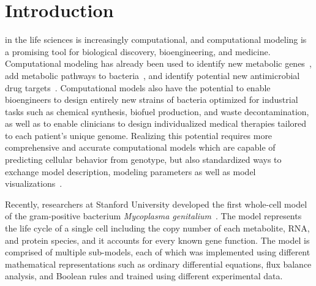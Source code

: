 \documentclass[journal,transmag]{IEEEtran}
\begin{document}
\maketitle
\IEEEdisplaynontitleabstractindextext
\IEEEpeerreviewmaketitle

\section{Introduction}
% 
% 
% 
% 

 in the life sciences is increasingly computational, and computational modeling is a promising tool for biological discovery, bioengineering, and medicine. Computational modeling has already been used to identify new metabolic genes~\cite{Reed2006}, add metabolic pathways to bacteria~\cite{Lee2009}, and identify potential new antimicrobial drug targets~\cite{Lee2012}. 
Computational models also have the potential to enable bioengineers to design entirely new strains of bacteria optimized for industrial tasks such as chemical synthesis, biofuel production, and waste decontamination, as well as to enable clinicians to design individualized medical therapies tailored to each patient's unique genome. 
Realizing this potential requires more comprehensive and accurate computational models which are capable of predicting cellular behavior from genotype, but also standardized ways to exchange model description, modeling parameters as well as model visualizations~\cite{Macklin2014,Karr2015,Klipp07}.

Recently, researchers at Stanford University developed the first whole-cell model of the gram-positive bacterium \textit{Mycoplasma genitalium}~\cite{Karr2012}. 
The model represents the life cycle of a single cell including the copy number of each metabolite, RNA, and protein species, and it accounts for every known gene function. 
The model is comprised of multiple sub-models, each of which was implemented using different mathematical representations such as ordinary differential equations, flux balance analysis, and Boolean rules and trained using different experimental data. 
\end{document}
